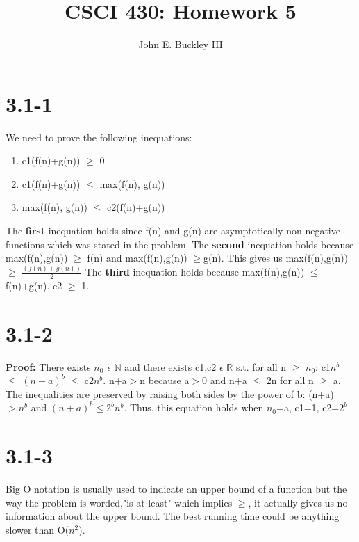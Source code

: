 \documentclass[12pt]{article}
\author{John E. Buckley III}
\title{CSCI 430: Homework 5}
\begin{document}
\maketitle

\section{3.1-1}

We need to prove the following inequations: \newline
\begin{enumerate}
\item c1(f(n)+g(n)) $\geq$ 0
\item c1(f(n)+g(n)) $\leq$ max(f(n), g(n))
\item max(f(n), g(n)) $\leq$ c2(f(n)+g(n)) \newline
\end{enumerate}
The \textbf{first} inequation holds since f(n) and g(n) are asymptotically non-negative functions which was stated in the problem. \newline \newline
The \textbf{second} inequation holds because max(f(n),g(n)) $\geq$ f(n) and max(f(n),g(n)) $\geq$g(n). This gives us max(f(n),g(n)) $\geq$ $\frac{(f(n)+g(n))}{2}$ \newline \newline
The \textbf{third} inequation holds because max(f(n),g(n)) $\leq$ f(n)+g(n). c2 $\geq$ 1.

\section{3.1-2}
\textbf{Proof:} There exists $n_0$ $\epsilon$ $ \mathbb{N}$ and there exists c1,c2 $\epsilon$ $\mathbb{R}$ s.t. for all n $\geq$ $n_0$: c1$n^b$ $\leq$ $(n+a)^b$ $\leq$ c2$n^b$. 
n+a$>$n because a$>$0 and n+a $\leq$ 2n for all n $\geq$ a. The inequalities are preserved by raising both sides by the power of b: (n+a)$>n^b$ and $(n+a)^b \leq 2^bn^b$. \newline 
Thus, this equation holds when $n_0$=a, c1=1, c2=$2^b$

\section{3.1-3}
Big O notation is usually used to indicate an upper bound of a function but the way the problem is worded,"is at least" which implies $\geq$, it actually gives us no information about the upper bound. The best running time could be anything slower than O($n^2$).
\end{document}
